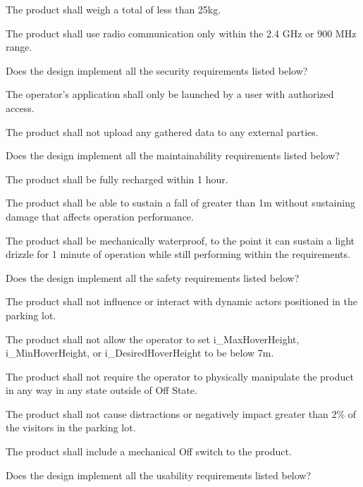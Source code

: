 \documentclass[12pt, titlepage]{article}
\begin{document}
\begin{todolist}
\begin{todolist}
    \item The product shall weigh a total of less than 25kg.
    \item The product shall use radio communication only within the 2.4 GHz or 900 MHz range.
\end{todolist}
\item Does the design implement all the security requirements listed below?
\begin{todolist}
    \item The operator's application shall only be launched by a user with authorized access.
    \item The product shall not upload any gathered data to any external parties.
\end{todolist}
\item Does the design implement all the maintainability requirements listed below?
\begin{todolist}
    \item The product shall be fully recharged within 1 hour.
    \item The product shall be able to sustain a fall of greater than 1m without sustaining damage that affects operation performance.
    \item The product shall be mechanically waterproof, to the point it can sustain a light drizzle for 1 minute of operation while still performing within the requirements.
\end{todolist}
\item Does the design implement all the safety requirements listed below?
\begin{todolist}
    \item The product shall not influence or interact with dynamic actors positioned in the parking lot.
    \item The product shall not allow the operator to set i\_MaxHoverHeight, i\_MinHoverHeight, or i\_DesiredHoverHeight to be below 7m.
    \item The product shall not require the operator to physically manipulate the product in any way in any state outside of Off State.
    \item The product shall not cause distractions or negatively impact greater than 2\% of the visitors in the parking lot.
    \item The product shall include a mechanical Off switch to the product.
\end{todolist}
\item Does the design implement all the usability requirements listed below?

\end{todolist}
\end{document}
